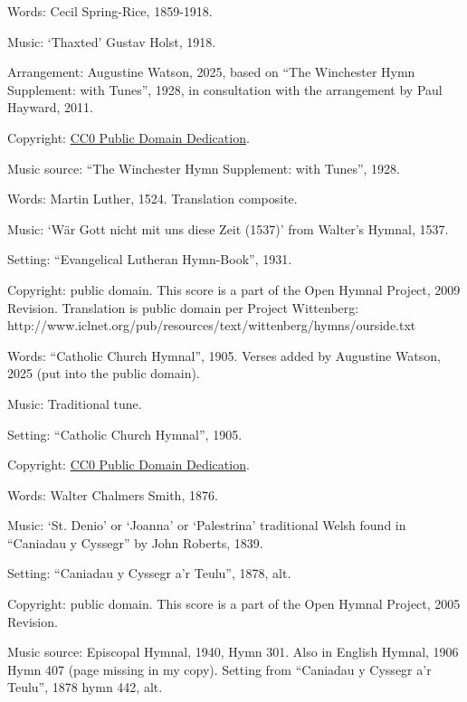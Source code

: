\begin{multicols}{2}
\par\noindent
Words: Cecil Spring-Rice, 1859-1918.
\par\noindent
Music: `Thaxted' Gustav Holst, 1918.
\par\noindent
Arrangement: Augustine Watson, 2025, based on ``The Winchester Hymn Supplement: with Tunes'', 1928, in consultation with the arrangement by Paul Hayward, 2011.
\par\noindent
Copyright: \href{https://creativecommons.org/publicdomain/zero/1.0/}{CC0 Public Domain Dedication}.
\par\noindent
Music source: ``The Winchester Hymn Supplement: with Tunes'', 1928.

\par\noindent
Words: Martin Luther, 1524.  Translation composite. 
\par\noindent
Music: `Wär Gott nicht mit uns diese Zeit (1537)' from Walter's Hymnal, 1537. 
\par\noindent
Setting: ``Evangelical Lutheran Hymn-Book'', 1931.
\par\noindent
Copyright: public domain. This score is a part of the Open Hymnal Project, 2009 Revision. Translation is public domain per Project Wittenberg: http://www.iclnet.org/pub/resources/text/wittenberg/hymns/ourside.txt

\par\noindent
Words: ``Catholic Church Hymnal'', 1905. Verses added by Augustine Watson, 2025 (put into the public domain).
\par\noindent
Music: Traditional tune.
\par\noindent
Setting: ``Catholic Church Hymnal'', 1905.
\par\noindent
Copyright: \href{https://creativecommons.org/publicdomain/zero/1.0/}{CC0 Public Domain Dedication}.

\par\noindent
Words: Walter Chalmers Smith, 1876. 
\par\noindent
Music: `St. Denio' or `Joanna' or `Palestrina' traditional Welsh found in ``Caniadau y Cyssegr'' by John Roberts, 1839.
\par\noindent
Setting: ``Caniadau y Cyssegr a'r Teulu'', 1878, alt.
\par\noindent
Copyright: public domain. This score is a part of the Open Hymnal Project, 2005 Revision.
\par\noindent
Music source: Episcopal Hymnal, 1940, Hymn 301.  Also in English Hymnal, 1906 Hymn 407 (page missing in my copy). Setting from ``Caniadau y Cyssegr a'r Teulu'', 1878 hymn 442, alt.


\end{multicols}
